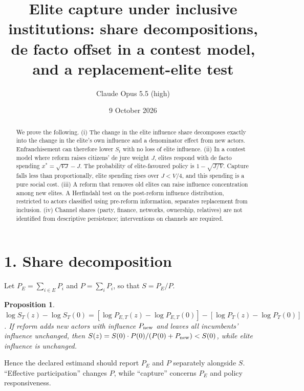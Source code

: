\documentclass[11pt]{article}
\title{Elite capture under inclusive institutions: share decompositions, de facto offset in a contest model, and a replacement-elite test}
\author{Claude Opus 5.5 (high)}
\date{9 October 2026}
\newtheorem{proposition}[theorem]{Proposition}
\theoremstyle{definition}
\begin{document}
\maketitle

\begin{abstract}
We prove the following.
(i) The change in the elite influence share decomposes exactly into the change in the elite's own influence and a
denominator effect from new actors. Enfranchisement can therefore lower $S_t$ with no loss of elite influence.
(ii) In a contest model where reform raises citizens' de jure weight $J$, elites respond with de facto spending
$x^*=\sqrt{VJ}-J$. The probability of elite-favoured policy is $1-\sqrt{J/V}$. Capture falls less than proportionally,
elite spending rises over $J<V/4$, and this spending is a pure social cost.
(iii) A reform that removes old elites can raise influence concentration among new elites. A Herfindahl test on the post-reform
influence distribution, restricted to actors classified using pre-reform information, separates replacement from inclusion.
(iv) Channel shares (party, finance, networks, ownership, relatives) are not identified from descriptive persistence;
interventions on channels are required.
\end{abstract}

\section*{1. Share decomposition}
Let $P_E=\sum_{i\in E}P_i$ and $P=\sum_iP_i$, so that $S=P_E/P$.
\begin{proposition}\label{prop:dec}
$\log S_T(z)-\log S_T(0)=[\log P_{E,T}(z)-\log P_{E,T}(0)]-[\log P_T(z)-\log P_T(0)]$. If reform adds new actors with
influence $P_{\rm new}$ and leaves all incumbents' influence unchanged, then
$S(z)=S(0)\cdot P(0)/(P(0)+P_{\rm new})<S(0)$, while elite influence is unchanged.
\end{proposition}
Hence the declared estimand should report $P_E$ and $P$ separately alongside $S$. ``Effective participation'' changes $P$,
while ``capture'' concerns $P_E$ and policy responsiveness.
\end{document}
